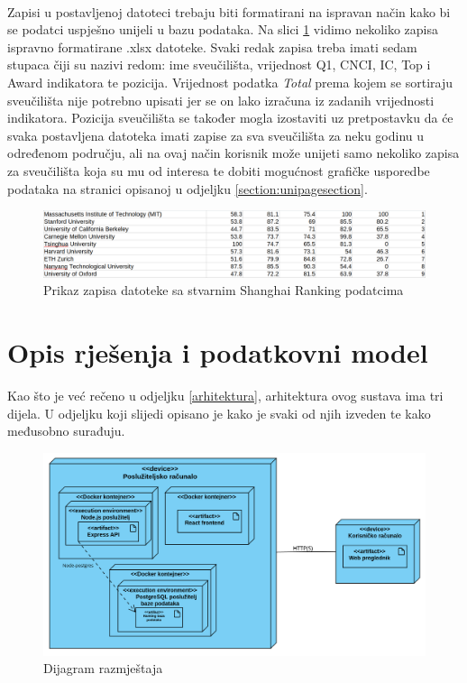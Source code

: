\documentclass[times, utf8, zavrsni]{fer}
\begin{document}
\\Zapisi u postavljenoj datoteci trebaju biti formatirani na ispravan način kako bi se podatci uspješno unijeli u bazu podataka. 
Na slici \ref{fig:real} vidimo nekoliko zapisa ispravno formatirane .xlsx datoteke. Svaki redak zapisa treba imati sedam stupaca čiji su nazivi redom:
ime sveučilišta, vrijednost Q1, CNCI, IC, Top i Award indikatora te pozicija. Vrijednost podatka \emph{Total} prema kojem se sortiraju 
sveučilišta nije potrebno upisati jer se on lako izračuna iz zadanih vrijednosti indikatora. Pozicija sveučilišta se također mogla
izostaviti uz pretpostavku da će svaka postavljena datoteka imati zapise za sva sveučilišta za neku godinu u određenom području, ali
na ovaj način korisnik može unijeti samo nekoliko zapisa za sveučilišta koja su mu od interesa te dobiti mogućnost 
grafičke usporedbe podataka na stranici opisanoj u odjeljku \ref{section:unipagesection}.
\begin{figure}[htb]
    \hspace*{-2cm} 
       \includegraphics[scale=0.3]{real.png} 
       \caption{Prikaz zapisa datoteke sa stvarnim Shanghai Ranking podatcima}
       \label{fig:real}
       \end{figure}  

\chapter{Opis rješenja i podatkovni model}
Kao što je već rečeno u odjeljku \ref{arhitektura}, arhitektura ovog sustava ima tri dijela. U odjeljku koji slijedi opisano je kako je svaki od njih izveden
te kako međusobno surađuju.
\begin{figure}[htb]
    \hspace*{-2.5cm} 
       \includegraphics[scale=0.3]{razmjestaj.png} 
       \caption{Dijagram razmještaja}
       \label{fig:razmjestaj}
       \end{figure}  
\end{document}
